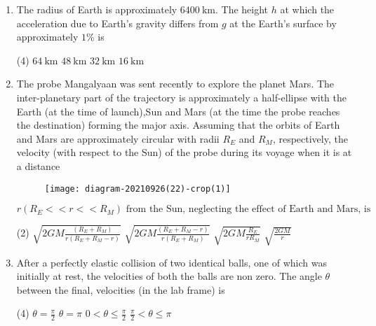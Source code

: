 \begin{enumerate}
	{}
\begin{tasks}(4)
	\task[\textbf{A.}] $m k^{2} / \sqrt{2} L^{3}$
	\task[\textbf{B.}]$m k^{2} / L^{3}$
	\task[\textbf{C.}]$\sqrt{2} m k^{2} / L^{3}$
	\task[\textbf{D.}]$\sqrt{3} m k^{2} / L^{3}$
\end{tasks}
	\item The radius of Earth is approximately $6400 \mathrm{~km}$. The height $h$ at which the acceleration due to Earth's gravity differs from $g$ at the Earth's surface by approximately $1 \%$ is
	{}
\begin{tasks}(4)
	\task[\textbf{A.}] $64 \mathrm{~km}$
	\task[\textbf{B.}] $48 \mathrm{~km}$
	\task[\textbf{C.}]$32 \mathrm{~km}$
	\task[\textbf{D.}]$16 \mathrm{~km}$
\end{tasks}
	\item The probe Mangalyaan was sent recently to explore the planet Mars. The inter-planetary part of the trajectory is approximately a half-ellipse with the Earth (at the time of launch),Sun and Mars (at the time the probe reaches the destination) forming the major axis. Assuming that the orbits of Earth and Mars are approximately circular with radii $R_{E}$ and $R_{M}$, respectively, the velocity (with respect to the Sun) of the probe during its voyage when it is at a distance
	\begin{figure}[H]
		\centering
		\texttt{[image: diagram-20210926(22)-crop(1)]}
	\end{figure}
	$r\left(R_{E}<<r<<R_{M}\right) \text { from the Sun, neglecting the effect of Earth and Mars, is }$
	{}
\begin{tasks}(2)
	\task[\textbf{A.}] $\sqrt{2 G M \frac{\left(R_{E}+R_{M}\right)}{r\left(R_{E}+R_{M}-r\right)}}$
	\task[\textbf{B.}]$\sqrt{2 G M \frac{\left(R_{E}+R_{M}-r\right)}{r\left(R_{E}+R_{M}\right)}}$
	\task[\textbf{C.}]$\sqrt{2 G M \frac{R_{E}}{r R_{M}}}$
	\task[\textbf{D.}]$\sqrt{\frac{2 G M}{r}}$
\end{tasks}
	\item After a perfectly elastic collision of two identical balls, one of which was initially at rest, the velocities of both the balls are non zero. The angle $\theta$ between the final, velocities (in the lab frame) is
	{}
\begin{tasks}(4)
	\task[\textbf{A.}] $\theta=\frac{\pi}{2}$
	\task[\textbf{B.}]$\theta=\pi$
	\task[\textbf{C.}]$0<\theta \leq \frac{\pi}{2}$
	\task[\textbf{D.}] $\frac{\pi}{2}<\theta \leq \pi$
\end{tasks}

\end{enumerate}
